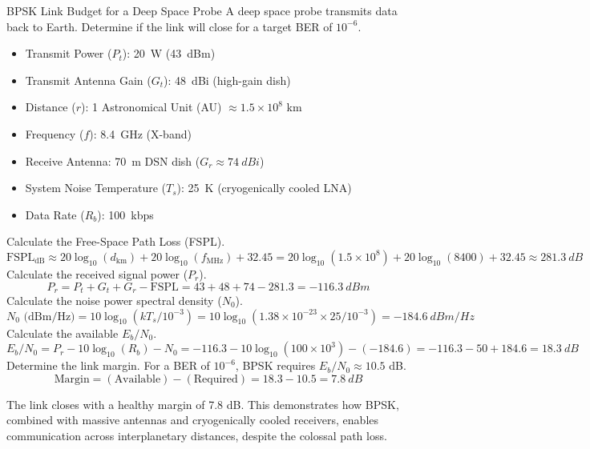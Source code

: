 \begin{workedexample}{BPSK Link Budget for a Deep Space Probe}
     A deep space probe transmits data back to Earth. Determine if the link will close for a target BER of $10^{-6}$.
    \begin{itemize}
        \item Transmit Power ($P_t$): \qty{20}{W} (\qty{43}{dBm})
        \item Transmit Antenna Gain ($G_t$): \qty{48}{dBi} (high-gain dish)
        \item Distance ($r$): 1 Astronomical Unit (AU) $\approx 1.5 \times 10^8$ km
        \item Frequency ($f$): \qty{8.4}{GHz} (X-band)
        \item Receive Antenna: \qty{70}{m} DSN dish ($G_r \approx \qty{74}{dBi}$)
        \item System Noise Temperature ($T_s$): \qty{25}{K} (cryogenically cooled LNA)
        \item Data Rate ($R_b$): \qty{100}{kbps}
    \end{itemize}
    \begin{derivationsteps}
        \step Calculate the Free-Space Path Loss (FSPL).
        \[ \text{FSPL}_{\text{dB}} \approx 20\log_{10}(d_{\text{km}}) + 20\log_{10}(f_{\text{MHz}}) + 32.45 = 20\log_{10}(1.5 \times 10^8) + 20\log_{10}(8400) + 32.45 \approx \qty{281.3}{dB} \]
        \step Calculate the received signal power ($P_r$).
        \[ P_r = P_t + G_t + G_r - \text{FSPL} = 43 + 48 + 74 - 281.3 = \qty{-116.3}{dBm} \]
        \step Calculate the noise power spectral density ($N_0$).
        \[ N_0 \text{ (dBm/Hz)} = 10\log_{10}(k T_s / 10^{-3}) = 10\log_{10}(1.38 \times 10^{-23} \times 25 / 10^{-3}) = \qty{-184.6}{dBm/Hz} \]
        \step Calculate the available $E_b/N_0$.
        \[ E_b/N_0 = P_r - 10\log_{10}(R_b) - N_0 = -116.3 - 10\log_{10}(100 \times 10^3) - (-184.6) = -116.3 - 50 + 184.6 = \qty{18.3}{dB} \]
        \step Determine the link margin. For a BER of $10^{-6}$, BPSK requires $E_b/N_0 \approx 10.5$ dB.
        \[ \text{Margin} = (\text{Available}) - (\text{Required}) = 18.3 - 10.5 = \qty{7.8}{dB} \]
    \end{derivationsteps}
     The link closes with a healthy margin of 7.8 dB. This demonstrates how BPSK, combined with massive antennas and cryogenically cooled receivers, enables communication across interplanetary distances, despite the colossal path loss.
\end{workedexample}


